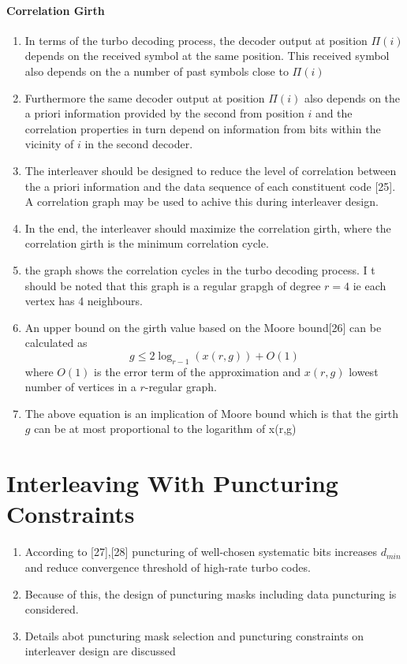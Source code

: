 \documentclass[fontsize=12pt]{article}
\begin{document}
\paragraph{Correlation Girth \newline}
\begin{enumerate}
\item In terms of the turbo decoding process, the decoder output at position $\Pi(i)$ depends on the received symbol at the same position. This received symbol also depends on the a number of past symbols close to $\Pi(i)$

\item Furthermore the same decoder output at position $\Pi(i)$ also depends on the a priori information provided by the second from position $i$ and the correlation properties in turn depend on information from bits within the vicinity of $i$ in the second decoder.

\item The interleaver should be designed to reduce the level of correlation between the a priori information and the data sequence of each constituent code [25]. A correlation graph may be used to achive this during interleaver design.

\item In the end, the interleaver should maximize the correlation girth, where the correlation girth is the minimum correlation cycle.

\item the graph shows the correlation cycles in the turbo decoding process. I t should be noted that this graph is a regular grapgh of degree $r=4$ ie each vertex has 4 neighbours.

\item An upper bound on the girth value based on the Moore bound[26] can be calculated as $$ g \leq 2 \log_{r-1}(x(r,g))+O(1)$$ where $O(1)$ is the error term of the approximation and $x(r,g)$ lowest number of vertices in a $r$-regular graph.

\item The above equation is an implication of Moore bound which is that the girth $g$ can be at most proportional to the logarithm of  x(r,g)
\end{enumerate}

\section{Interleaving With Puncturing Constraints}
\begin{enumerate}
\item According to [27],[28] puncturing of well-chosen systematic bits increases $d_{min}$ and reduce convergence threshold of high-rate turbo codes.

\item Because of this, the design of puncturing masks including data puncturing is considered.

\item Details abot puncturing mask selection and puncturing constraints on interleaver design are discussed
\end{enumerate}
\end{document}
